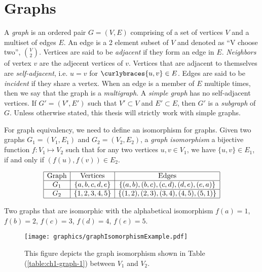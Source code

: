 \section{Graphs}
A \textit{graph} is an ordered pair $G = (V,E)$ comprising of a set of vertices $V$ and a multiset of edges $E$.  
An edge is a 2 element subset of $V$ and denoted as ``V choose two'', ${V \choose 2}$.
Vertices are said to be \textit{adjacent} if they form an edge in $E$.  
\textit{Neighbors} of vertex $v$ are the adjecent vertices of $v$.
Vertices that are adjacent to themselves are \textit{self-adjacent}, i.e. $u = v$ for $\curlybraces{u,v} \in E$.  
Edges are said to be \textit{incident} if they share a vertex.  
When an edge is a member of $E$ multiple times, then we say that the graph is a \textit{multigraph}.   
A \textit{simple graph} has no self-adjacent vertices. 
If $G' = (V',E')$ such that $V' \subset V$ and $E' \subset E$, then $G'$ is a \textit{subgraph} of $G$.
Unless otherwise stated, this thesis will strictly work with simple graphs.

For graph equivalency, we need to define an isomorphism for graphs.  Given 
two graphs $G_1 =(V_1,E_1)$ and $G_2 = (V_2,E_2) $, a \textit{graph isomorphism} a bijective 
function $f: V_1 \mapsto 
V_2$ 
such that for any two vertices $u,v \in V_1$, we have $\{u, v\} \in E_1$, if and 
only 
if $(f(u),f(v)) \in E_2$. 
\begin{table}[!htbp]\label{table:ch1-graph-1}
\begin{center}
$$\begin{array}{|c|c|c|}\hline
\text{Graph}&\text{Vertices}&\text{Edges}\\\hline
G_1&\left\lbrace a,b,c,d,e \right\rbrace & \left\lbrace (a,b),(b,c),(c,d),(d,e),(e,a) \right\rbrace 
\\\hline
G_2&\left\lbrace 1,2,3,4,5 \right\rbrace & \left\lbrace (1,2),(2,3),(3,4),(4,5),(5,1) \right\rbrace 
\\\hline
\end{array} $$
\caption{Two graphs that are isomorphic with the alphabetical isomorphism $f(a)=1$, $f(b)=2$, $f(c) 
= 3$, $f(d)=4$, $f(e)=5$.}
\end{center} 
\end{table}

\begin{figure}[!htbp]
\begin{center}
\texttt{[image: graphics/graphIsomorphismExample.pdf]}
\end{center} 
\caption{This figure depicts the graph isomorphism shown in Table 
(\ref{table:ch1-graph-1}) between 
$V_1$ and $V_2$.}
\label{fig:configuration-3}
\end{figure}

